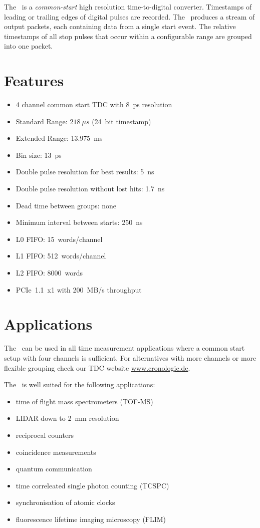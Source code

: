 The \deviceName\ is a \emph{common-start} high resolution time-to-digital converter. 
Timestamps of leading or trailing edges of digital pulses are recorded. 
The \deviceName\ produces a stream of output packets, each containing data from a single start event. 
The relative timestamps of all stop pulses that occur within a configurable range are grouped into one packet.

\section{Features}
	\begin{itemize}
		\item 4 channel common start TDC with 8~ps resolution
		\item Standard Range: $218~\mu s$ (24~bit timestamp)
		\item Extended Range: 13.975~ms
		\item Bin size: 13~ps
		\item Double pulse resolution for best results: 5~ns
		\item Double pulse resolution without lost hits: 1.7~ns
		\item Dead time between groups: none
		\item Minimum interval between starts: 250~ns
		\item L0 FIFO: 15~words/channel
		\item L1 FIFO: 512~words/channel
		\item L2 FIFO: 8000~words
		\item PCIe~1.1~x1 with 200~MB/s throughput
	\end{itemize} 


\section{Applications}
The \deviceName\ can be used in all time measurement applications where a common start setup with four channels is sufficient. 
For alternatives with more channels or more flexible grouping check our TDC website \href{https://www.cronologic.de/produkte/products-overview#tdcdata}{www.cronologic.de}.

The \deviceName\ is well suited for the following applications:
\begin{itemize}
	\item time of flight mass spectrometers (TOF-MS)
	\item LIDAR down to 2~mm resolution
	\item reciprocal counters
	\item coincidence measurements
	\item quantum communication
	\item time correleated single photon counting (TCSPC)
	\item synchronisation of atomic clocks
	\item fluorescence lifetime imaging microscopy (FLIM)
\end{itemize} 